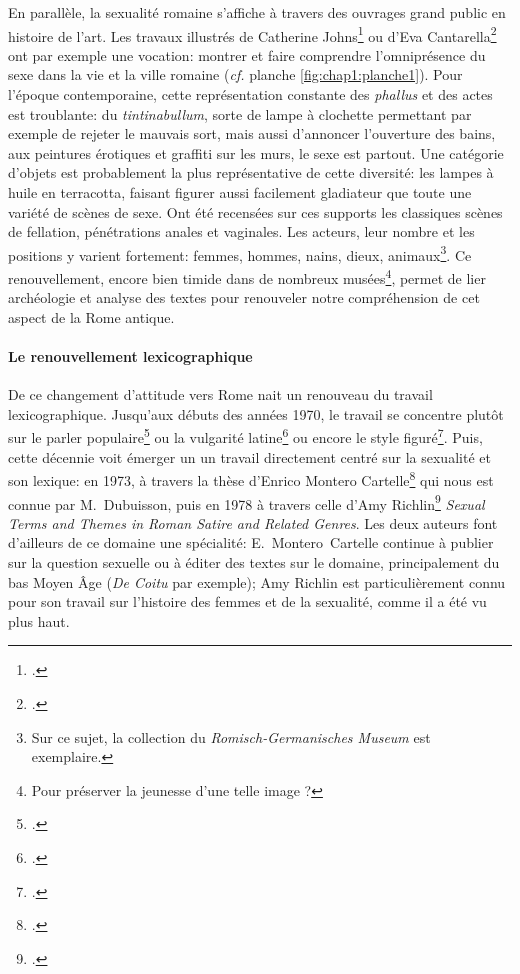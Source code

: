 En parallèle, la sexualité romaine s'affiche à travers des ouvrages grand public en histoire de l'art. Les travaux illustrés de Catherine Johns\footcite{johns2000sex} ou d'Eva Cantarella\footcite{cantarella_pompei_2000} ont par exemple une vocation: montrer et faire comprendre l'omniprésence du sexe dans la vie et la ville romaine (\textit{cf.} planche \ref{fig:chap1:planche1}). Pour l'époque contemporaine, cette représentation constante des \textit{phallus} et des actes est troublante: du \textit{tintinabullum}, sorte de lampe à clochette permettant par exemple de rejeter le mauvais sort, mais aussi d'annoncer l'ouverture des bains, aux peintures érotiques et graffiti sur les murs, le sexe est partout. Une catégorie d'objets est probablement la plus représentative de cette diversité: les lampes à huile en terracotta, faisant figurer aussi facilement gladiateur que toute une variété de scènes de sexe. Ont été recensées sur ces supports les classiques scènes de fellation, pénétrations anales et vaginales. Les acteurs, leur nombre et les positions y varient fortement: femmes, hommes, nains, dieux, animaux\footnote{Sur ce sujet, la collection du \textit{Romisch-Germanisches Museum} est exemplaire.}. Ce renouvellement, encore bien timide dans de nombreux musées\footnote{Pour préserver la jeunesse d'une telle image ?}, permet de lier archéologie et analyse des textes pour renouveler notre compréhension de cet aspect de la Rome antique.

\paragraph{Le renouvellement lexicographique}

De ce changement d'attitude vers Rome nait un renouveau du travail lexicographique. Jusqu'aux débuts des années 1970, le travail se concentre plutôt sur le parler populaire\footcite{otto_sprichworter_1890} ou la vulgarité latine\footcite{opelt1970schimpfworter} ou encore le style figuré\footcite{opelt1966euphemismus}. Puis, cette décennie voit émerger un un travail directement centré sur la sexualité et son lexique: en 1973, à travers la thèse d'Enrico Montero Cartelle\footcite{montero_cartelle_aspectos_1973} qui nous est connue par M.~Dubuisson, puis en 1978 à travers celle d'Amy Richlin\footcite{richlin_sexual_1978} \textit{Sexual Terms and Themes in Roman Satire and Related Genres}. Les deux auteurs font d'ailleurs de ce domaine une spécialité: E.~Montero~Cartelle continue à publier sur la question sexuelle ou à éditer des textes sur le domaine, principalement du bas Moyen Âge (\textit{De Coitu} par exemple); Amy Richlin est particulièrement connu pour son travail sur l'histoire des femmes et de la sexualité, comme il a été vu plus haut. 

